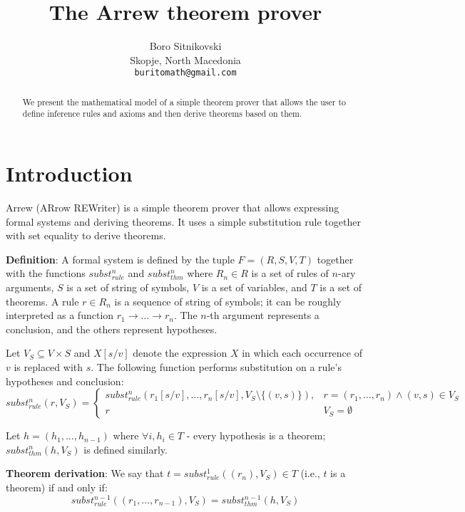\documentclass{article}
\title{The Arrew theorem prover}
\author{
  Boro Sitnikovski \\
  Skopje, North Macedonia \\
  \texttt{buritomath@gmail.com} \\
}
\begin{document}
\maketitle

\begin{abstract}
We present the mathematical model of a simple theorem prover that allows the user to define inference rules and axioms and then derive theorems based on them.
\end{abstract}


\section{Introduction }

Arrew (ARrow REWriter) is a simple theorem prover that allows expressing formal systems and deriving theorems. It uses a simple substitution rule together with set equality to derive theorems.

\textbf{Definition}: A formal system is defined by the tuple $F = (R, S, V, T)$ together with the functions $subst_{rule}^n$ and $subst_{thm}^n$ where $R_n \in R$ is a set of rules of $n$-ary arguments, $S$ is a set of string of symbols, $V$ is a set of variables, and $T$ is a set of theorems. A rule $r \in R_n$ is a sequence of string of symbols; it can be roughly interpreted as a function $r_1 \to \ldots \to r_n$. The $n$-th argument represents a conclusion, and the others represent hypotheses.

Let $V_S \subseteq V \times S$ and $X[s/v]$ denote the expression $X$ in which each occurrence of $v$ is replaced with $s$. The following function performs substitution on a rule's hypotheses and conclusion:
$$ subst_{rule}^n(r, V_S) = {
\begin{cases}
subst_{rule}^n(r_1[s/v], \ldots, r_n[s/v], V_S \setminus \{(v, s) \}), & r = (r_1, \ldots, r_n) \land (v, s) \in V_S \\
r & V_S = \emptyset
\end{cases}}
$$

Let $h = (h_1, \ldots, h_{n-1})$ where $\forall i, h_i \in T$ - every hypothesis is a theorem; $subst_{thm}^n(h, V_S)$ is defined similarly.

\textbf{Theorem derivation}: We say that $t = subst_{rule}^1((r_n), V_S) \in T$ (i.e., $t$ is a theorem) if and only if:
$$subst_{rule}^{n-1}((r_1, \ldots, r_{n-1}), V_S) = subst_{thm}^{n-1}(h, V_S)$$
\end{document}
